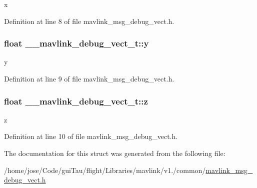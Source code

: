 x 



Definition at line 8 of file mavlink\-\_\-msg\-\_\-debug\-\_\-vect.\-h.

\hypertarget{struct____mavlink__debug__vect__t_a400c1d51e5edb6686737999ae6e4aba7}{
\subsubsection[{y}]{\setlength{\rightskip}{0pt plus 5cm}float \-\_\-\-\_\-mavlink\-\_\-debug\-\_\-vect\-\_\-t\-::y}}\label{struct____mavlink__debug__vect__t_a400c1d51e5edb6686737999ae6e4aba7}


y 



Definition at line 9 of file mavlink\-\_\-msg\-\_\-debug\-\_\-vect.\-h.

\hypertarget{struct____mavlink__debug__vect__t_a8fdd83fc7a64d6a8200dea9dddf58ee9}{
\subsubsection[{z}]{\setlength{\rightskip}{0pt plus 5cm}float \-\_\-\-\_\-mavlink\-\_\-debug\-\_\-vect\-\_\-t\-::z}}\label{struct____mavlink__debug__vect__t_a8fdd83fc7a64d6a8200dea9dddf58ee9}


z 



Definition at line 10 of file mavlink\-\_\-msg\-\_\-debug\-\_\-vect.\-h.



The documentation for this struct was generated from the following file\-:\begin{DoxyCompactItemize}
\item 
/home/jose/\-Code/gui\-Tau/flight/\-Libraries/mavlink/v1./common/\hyperlink{mavlink__msg__debug__vect_8h}{mavlink\-\_\-msg\-\_\-debug\-\_\-vect.\-h}\end{DoxyCompactItemize}

